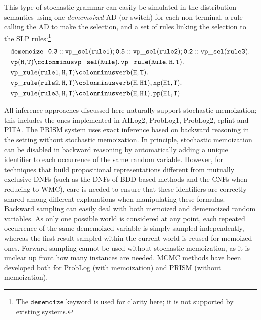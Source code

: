 \documentclass[a4paper]{article}
\begin{document}
This type of stochastic grammar can easily be simulated in the distribution semantics using 
one {\em dememoized} AD (or switch) for each  non-terminal, a rule
calling the AD to 
make the selection, and a set of rules linking the selection to the
SLP rules:\footnote{The
  $\mathtt{dememoize}$ keyword is used for clarity here; it is not
  supported by existing systems.}
\begin{align*}
&\mathtt{dememoize~~0.3:: vp\_sel(rule1);0.5:: vp\_sel(rule2); 0.2 ::
  vp\_sel(rule3).}\\
&\mathtt{ vp(H,T)}\colonminus \mathtt{  vp\_sel(Rule), vp\_rule(Rule,H,T).}\\
&\mathtt{vp\_rule(rule1,H,T)}\colonminus \mathtt{  verb(H,T).}\\
&\mathtt{vp\_rule(rule2,H,T)}\colonminus \mathtt{  verb(H,H1),np(H1,T).}\\
&\mathtt{vp\_rule(rule3,H,T)}\colonminus \mathtt{  verb(H,H1),pp(H1,T).}\\
\end{align*}



All inference approaches discussed here naturally support stochastic memoization; this
includes the ones implemented in 
AILog2, ProbLog1, ProbLog2, cplint and PITA. The PRISM system uses
exact inference based on backward reasoning in the setting without
stochastic memoization. In principle, stochastic memoization can be
disabled in backward reasoning by automatically adding a unique identifier to each occurrence of
the same random variable. However, for techniques that
build propositional representations different from mutually exclusive DNFs (such as the DNFs of BDD-based methods and the
CNFs when reducing to WMC), care is needed to ensure that these
identifiers are correctly shared among different explanations when
manipulating these formulas. 
Backward sampling can easily deal with both memoized and dememoized
random variables. As only one possible world is considered at any
point, each repeated occurrence of the same dememoized variable is
simply sampled independently, whereas the first result sampled within
the current world is reused for memoized ones. 
Forward sampling cannot be used without stochastic memoization, as it is
unclear up front how many instances are needed. 
MCMC methods have been developed both for ProbLog (with memoization)
and PRISM (without memoization). 
\end{document}

